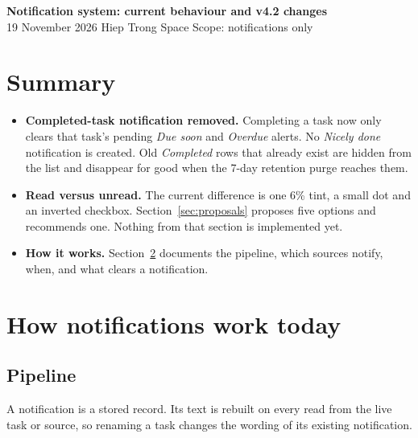 ﻿\documentclass[10.5pt,a4paper]{article}
\begin{document}
{\LARGE\bfseries Notification system: current behaviour and v4.2 changes}\\[2pt]
{\small 19 November 2026 \quad Hiep Trong Space \quad Scope: notifications only}

\section{Summary}

\begin{itemize}
  \item \textbf{Completed-task notification removed.} Completing a task now only clears that task's pending \emph{Due soon} and \emph{Overdue} alerts. No \emph{Nicely done} notification is created. Old \emph{Completed} rows that already exist are hidden from the list and disappear for good when the 7-day retention purge reaches them.
  \item \textbf{Read versus unread.} The current difference is one 6\% tint, a small dot and an inverted checkbox. Section~\ref{sec:proposals} proposes five options and recommends one. Nothing from that section is implemented yet.
  \item \textbf{How it works.} Section~\ref{sec:how} documents the pipeline, which sources notify, when, and what clears a notification.
\end{itemize}

\section{How notifications work today}\label{sec:how}

\subsection{Pipeline}

A notification is a stored record. Its text is rebuilt on every read from the live task or source, so renaming a task changes the wording of its existing notification.
\end{document}

